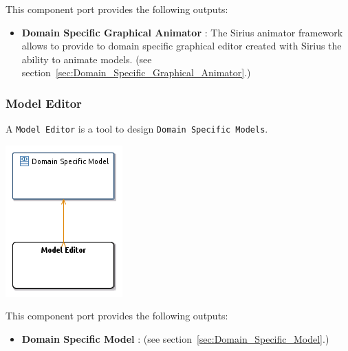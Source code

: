 \documentclass{gemoc} %
\begin{document}
This component port provides the following outputs:
\begin{itemize}
  \item \textbf{Domain Specific Graphical Animator} :
The Sirius animator framework allows to provide to domain specific graphical editor created with Sirius the ability to animate models.
(see section~\ref{sec:Domain_Specific_Graphical_Animator}.)
\end{itemize}




\subsubsection{Model Editor}
\label{sec:Model_Editor}
A \texttt{Model Editor} is a tool to design \texttt{Domain Specific Models}.
\begin{center}
\includegraphics*[trim=0.0cm 0.0cm 0cm 0.0cm, clip=true]{../images/generated/Generated_Model_Editor.png}
\end{center}


This component port provides the following outputs:
\begin{itemize}
  \item \textbf{Domain Specific Model} :
(see section~\ref{sec:Domain_Specific_Model}.)
\end{itemize}
\end{document}
